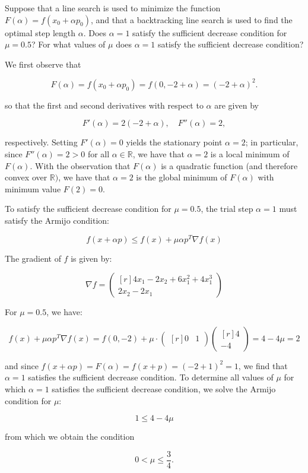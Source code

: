 Suppose that a line search is used to minimize the function $F(\alpha) = f(x_0 + \alpha p_0)$, and that a backtracking
line search is used to find the optimal step length $\alpha$. Does $\alpha = 1$ satisfy the sufficient decrease 
condition for $\mu = 0.5$? For what values of $\mu$ does $\alpha = 1$ satisfy the sufficient decrease condition?

\begin{solution}
    We first observe that

    $$
    F(\alpha) = f(x_0 + \alpha p_0) = f(0, -2 + \alpha) = (-2 + \alpha)^2.
    $$

    so that the first and second derivatives with respect to $\alpha$ are given by

    $$
    F'(\alpha) = 2(-2 + \alpha), \quad F''(\alpha) = 2,
    $$

    respectively. Setting $F'(\alpha) = 0$ yields the stationary point $\alpha = 2$; in particular, since 
    $F''(\alpha) = 2 > 0 $ for all $\alpha \in \mathbb{R}$, we have that $\alpha = 2$ is a local minimum of $F(\alpha)$.
    With the observation that $F(\alpha)$ is a quadratic function (and therefore convex over $\mathbb{R})$, we have 
    that $\alpha = 2$ is the global minimum of $F(\alpha)$ with minimum value $F(2) = 0$.

    To satisfy the sufficient decrease condition for $\mu = 0.5$, the trial step $\alpha = 1$ must satisfy the Armijo 
    condition:

    $$
    f(x + \alpha p) \le f(x) + \mu \alpha p^T \nabla f(x)
    $$

    The gradient of $f$ is given by:

    $$
    \nabla f = \begin{pmatrix*}[r]
         4 x_1 - 2 x_2 + 6 x_1^2 + 4 x_1^3  \\
         2 x_2 - 2 x_1
    \end{pmatrix*}
    $$

    For $\mu = 0.5$, we have:
    
    $$
    f(x) + \mu \alpha p^T \nabla f(x) = f(0, -2) + \mu \cdot \begin{pmatrix*}[r] 0 & 1 \end{pmatrix*} \begin{pmatrix*}[r] 4 \\ -4 \end{pmatrix*} = 4 - 4 \mu = 2
    $$

    and since $f(x + \alpha p) = F(\alpha) = f(x + p) = (-2 + 1)^2 = 1$, we find that $\alpha = 1$ satisfies the 
    sufficient decrease condition. To determine all values of $\mu$ for which $\alpha = 1$ satisfies the sufficient 
    decrease condition, we solve the Armijo condition for $\mu$:

    $$
    1 \le 4 - 4 \mu
    $$

    from which we obtain the condition

    $$
    0 < \mu \le \frac{3}{4}.
    $$
    \ \\
\end{solution}

